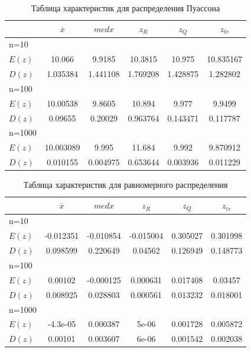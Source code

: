 \documentclass[a4paper,14pt]{article}
\begin{document}
	\begin{table}[H]
		\centering
		\begin{tabular}{|l||c|c|c|c|c|}
			\hline
			& $\overline{x}$ & $med x$ & $z_R$ & $z_Q$ & $z_{tr}$\\\hline\hline
			n=10 & & & & &\\\hline
			$E(z)$ & 10.066 & 9.9185 & 10.3815 & 10.975 & 10.835167\\\hline
			$D(z)$ & 1.035384 & 1.441108 & 1.769208 & 1.428875 & 1.282802\\\hline
			n=100 & & & & &\\\hline
			$E(z)$ & 10.00538 & 9.8605 & 10.894 & 9.977 & 9.9499\\\hline
			$D(z)$ & 0.09655 & 0.20029 & 0.963764 & 0.143471 & 0.117787\\\hline
			n=1000 & & & & &\\\hline
			$E(z)$ & 10.003089 & 9.995 & 11.684 & 9.992 & 9.870912\\\hline
			$D(z)$ & 0.010155 & 0.004975 & 0.653644 & 0.003936 & 0.011229\\\hline
		\end{tabular}
		\caption{Таблица характеристик для распределения Пуассона}
		\label{tab:poisson}
	\end{table}
	
	\begin{table}[H]
		\centering
		\begin{tabular}{|l||c|c|c|c|c|}
			\hline
			& $\overline{x}$ & $med x$ & $z_R$ & $z_Q$ & $z_{tr}$\\\hline\hline
			n=10 & & & & &\\\hline
			$E(z)$ & -0.012351 & -0.010854 & -0.015004 & 0.305027 & 0.301998\\\hline
			$D(z)$ & 0.098599 & 0.220649 & 0.04562 & 0.126949 & 0.148773\\\hline
			n=100 & & & & &\\\hline
			$E(z)$ & 0.00102 & -0.000125 & 0.000631 & 0.017408 & 0.03457\\\hline
			$D(z)$ & 0.008925 & 0.028803 & 0.000561 & 0.013232 & 0.018001\\\hline
			n=1000 & & & & &\\\hline
			$E(z)$ & -4.3e-05 & 0.000387 & 5e-06 & 0.001728 & 0.005872\\\hline
			$D(z)$ & 0.00101 & 0.003607 & 6e-06 & 0.001542 & 0.002038\\\hline
		\end{tabular}
		\caption{Таблица характеристик для равномерного распределения}
		\label{tab:uniform}
	\end{table}
\end{document}
